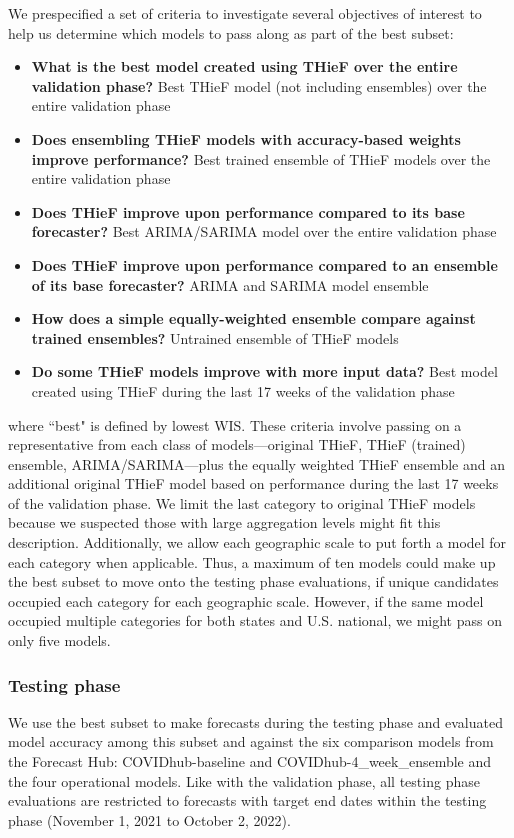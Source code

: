 \documentclass[12pt]{article}
\begin{document}
We prespecified a set of criteria to investigate several objectives of interest to help us determine which models to pass along as part of the best subset:
\begin{itemize}
\item \textbf{What is the best model created using THieF over the entire validation phase?} \newline Best THieF model (not including ensembles) over the entire validation phase
\item \textbf{Does ensembling THieF models with accuracy-based weights improve performance?} \newline Best trained ensemble of THieF models over the entire validation phase
\item \textbf{Does THieF improve upon performance compared to its base forecaster?} \newline Best ARIMA/SARIMA model over the entire validation phase
\item \textbf{Does THieF improve upon performance compared to an ensemble of its base forecaster?} \newline ARIMA and SARIMA model ensemble
\item \textbf{How does a simple equally-weighted ensemble compare against trained ensembles?} \newline Untrained ensemble of THieF models
\item \textbf{Do some THieF models improve with more input data?} \newline Best model created using THieF during the last 17 weeks of the validation phase
\end{itemize}
where ``best" is defined by lowest WIS. These criteria involve passing on a representative from each class of models---original THieF, THieF (trained) ensemble, ARIMA/SARIMA---plus the equally weighted THieF ensemble and an additional original THieF model based on performance during the last 17 weeks of the validation phase. We limit the last category to original THieF models because we suspected those with large aggregation levels might fit this description. Additionally, we allow each geographic scale to put forth a model for each category when applicable. Thus, a maximum of ten models could make up the best subset to move onto the testing phase evaluations, if unique candidates occupied each category for each geographic scale. However, if the same model occupied multiple categories for both states and U.S. national, we might pass on only five models.

\subsubsection{Testing phase} \label{testing_eval}
We use the best subset to make forecasts during the testing phase and evaluated model accuracy among this subset and against the six comparison models from the Forecast Hub: COVIDhub-baseline and COVIDhub-4\_week\_ensemble and the four operational models. Like with the validation phase, all testing phase evaluations are restricted to forecasts with target end dates within the testing phase (November 1, 2021 to October 2, 2022).
\end{document}
